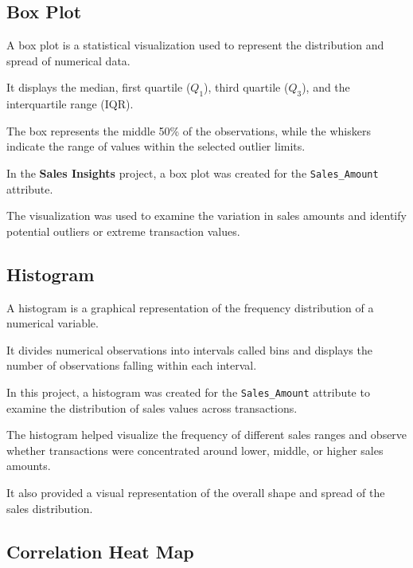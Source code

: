 \documentclass[12pt,a4paper]{report}
\begin{document}

\subsection{Box Plot}

A box plot is a statistical visualization
used to represent the distribution
and spread of numerical data.

It displays the median, first quartile
($Q_1$), third quartile ($Q_3$),
and the interquartile range (IQR).

The box represents the middle
50\% of the observations, while
the whiskers indicate the range
of values within the selected
outlier limits.

In the \textbf{Sales Insights} project,
a box plot was created for the
\texttt{Sales\_Amount} attribute.

The visualization was used to examine
the variation in sales amounts and
identify potential outliers or
extreme transaction values.


\subsection{Histogram}

A histogram is a graphical representation
of the frequency distribution of
a numerical variable.

It divides numerical observations
into intervals called bins and
displays the number of observations
falling within each interval.

In this project, a histogram was
created for the \texttt{Sales\_Amount}
attribute to examine the distribution
of sales values across transactions.

The histogram helped visualize
the frequency of different sales
ranges and observe whether
transactions were concentrated
around lower, middle, or
higher sales amounts.

It also provided a visual
representation of the overall
shape and spread of the
sales distribution.


\subsection{Correlation Heat Map}
\end{document}
